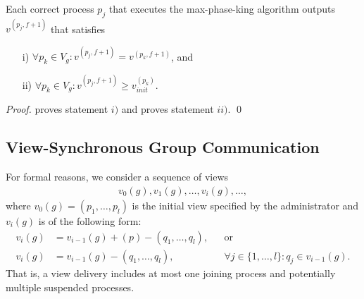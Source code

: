 \documentclass[runningheads]{llncs}
\begin{document}
\begin{theorem}\label{theorem:maxpk}
    Each correct process $p_j$ that executes the max-phase-king algorithm outputs $v^{(p_j, f+1)}$ that satisfies
    \begin{enumerate}
        \item[i)] $\forall p_k \in V_g: v^{(p_j, f+1)} = v^{(p_k, f+1)}$, and 
        \item[ii)] $\forall p_k \in V_g: v^{(p_j, f+1)} \geq v_{init}^{(p_k)}$.
    \end{enumerate}
\end{theorem}
\begin{proof}
     proves statement $i)$ and  proves statement $ii)$. \qed
\end{proof}

\subsection{View-Synchronous Group Communication} \label{appendix:view_sync_comm}
For formal reasons, we consider a sequence of views 
\begin{align*}
    v_0(g), v_1(g), \ldots, v_i(g), \ldots,
\end{align*}
where $v_0(g) = (p_1, \ldots, p_l)$ is the initial view specified by the administrator and $v_i(g)$ is of the following form:
\begin{equation}
    \begin{aligned}\label{eq:view}
        v_i(g) &= v_{i-1}(g) + (p) - (q_1, \ldots, q_l), &&\text{or}\\
        v_i(g) &= v_{i-1}(g) - (q_1, \ldots, q_l), &&\forall j \in \{1, \ldots, l\}: q_j \in v_{i-1}(g).
    \end{aligned}
\end{equation}
That is, a view delivery includes at most one joining process and potentially multiple suspended processes. 
\end{document}
